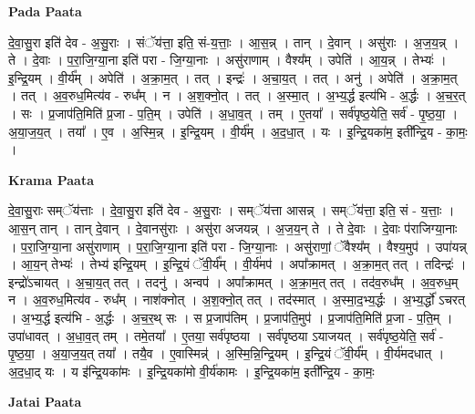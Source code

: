 \documentclass[17pt]{extarticle}
\begin{document}
\textbf{Pada Paata} \newline

दे॒वा॒सु॒रा इति॑ देव - अ॒सु॒राः । संॅय॑त्ता॒ इति॒ सं-य॒त्ताः॒ । आ॒स॒न्न् । तान् । दे॒वान् । असु॑राः । अ॒ज॒य॒न्न् । ते । दे॒वाः । प॒रा॒जि॒ग्या॒ना इति॑ परा - जि॒ग्या॒नाः । असु॑राणाम् । वैश्य᳚म् । उपेति॑ । आ॒य॒न्न् । तेभ्यः॑ । इ॒न्द्रि॒यम् । वी॒र्य᳚म् । अपेति॑ । अ॒क्रा॒म॒त् । तत् । इन्द्रः॑ । अ॒चा॒य॒त् । तत् । अनु॑ । अपेति॑ । अ॒क्रा॒म॒त् । तत् । अ॒व॒रुध॒मित्य॑व - रुध᳚म् । न । अ॒श॒क्नो॒त् । तत् । अ॒स्मा॒त् । अ॒भ्य॒र्द्ध इत्य॑भि - अ॒र्द्धः । अ॒च॒र॒त् । सः । प्र॒जाप॑ति॒मिति॑ प्र॒जा - प॒ति॒म् । उपेति॑ । अ॒धा॒व॒त् । तम् । ए॒तया᳚ । सर्व॑पृष्ठ॒येति॒ सर्व॑ - पृ॒ष्ठ॒या॒ । अ॒या॒ज॒य॒त् । तया᳚ । ए॒व । अ॒स्मि॒न्न् । इ॒न्द्रि॒यम् । वी॒र्य᳚म् । अ॒द॒धा॒त् । यः । इ॒न्द्रि॒यका॑म॒ इती᳚न्द्रि॒य - का॒मः॒ ।  \newline


\textbf{Krama Paata} \newline

दे॒वा॒सु॒राः सम्ॅय॑त्ताः । दे॒वा॒सु॒रा इति॑ देव - अ॒सु॒राः । सम्ॅय॑त्ता आसन्न् । सम्ॅय॑त्ता॒ इति॒ सं - य॒त्ताः॒ । आ॒स॒न् तान् । तान् दे॒वान् । दे॒वानसु॑राः । असु॑रा अजयन्न् । अ॒ज॒य॒न् ते । ते दे॒वाः । दे॒वाः प॑राजिग्या॒नाः । प॒रा॒जि॒ग्या॒ना असु॑राणाम् । प॒रा॒जि॒ग्या॒ना इति॑ परा - जि॒ग्या॒नाः । असु॑राणां॒ ॅवैश्य᳚म् । वैश्य॒मुप॑ । उपा॑यन्न् । आ॒य॒न् तेभ्यः॑ । तेभ्य॑ इन्द्रि॒यम् । इ॒न्द्रि॒यं ॅवी॒र्य᳚म् । वी॒र्य॑मप॑ । अपा᳚क्रामत् । अ॒क्रा॒म॒त् तत् । तदिन्द्रः॑ । इन्द्रो॑ऽचायत् । अ॒चा॒य॒त् तत् । तदनु॑ । अन्वप॑ । अपा᳚क्रामत् । अ॒क्रा॒म॒त् तत् । तद॑व॒रुध᳚म् । अ॒व॒रुध॒म् न । अ॒व॒रुध॒मित्य॑व - रुध᳚म् । नाश॑क्नोत् । अ॒श॒क्नो॒त् तत् । तद॑स्मात् । अ॒स्मा॒द॒भ्य॒र्द्धः । अ॒भ्य॒र्द्धो॑ ऽचरत् । अ॒भ्य॒र्द्ध इत्य॑भि - अ॒र्द्धः । अ॒च॒र॒थ् सः । स प्र॒जाप॑तिम् । प्र॒जाप॑ति॒मुप॑ । प्र॒जाप॑ति॒मिति॑ प्र॒जा - प॒ति॒म् । उपा॑धावत् । अ॒धा॒व॒त् तम् । तमे॒तया᳚ । ए॒तया॒ सर्व॑पृष्ठया । सर्व॑पृष्ठया ऽयाजयत् । सर्व॑पृष्ठ॒येति॒ सर्व॑ - पृ॒ष्ठ॒या॒ । अ॒या॒ज॒य॒त् तया᳚ । तयै॒व । ए॒वास्मिन्न्॑ । अ॒स्मि॒न्नि॒न्द्रि॒यम् । इ॒न्द्रि॒यं ॅवी॒र्य᳚म् । वी॒र्य॑मदधात् । अ॒द॒धा॒द् यः । य इ॑न्द्रि॒यका॑मः । इ॒न्द्रि॒यका॑मो वी॒र्य॑कामः । इ॒न्द्रि॒यका॑म॒ इती᳚न्द्रि॒य - का॒मः॒ \newline

\textbf{Jatai Paata} \newline
\end{document}
